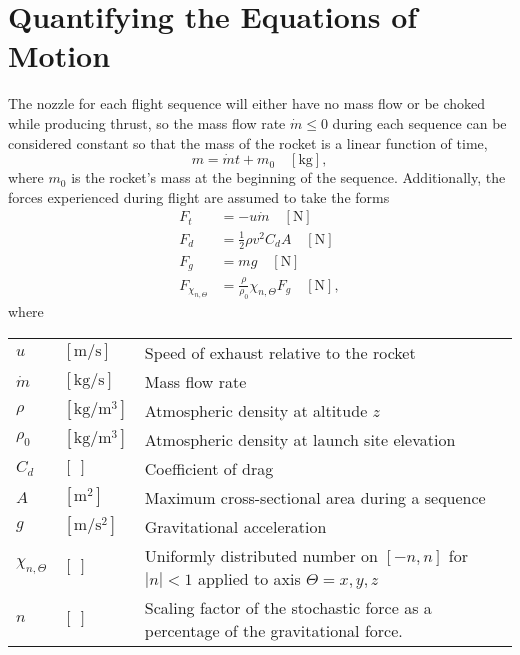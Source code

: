 \documentclass[11pt]{thesis}
\numberwithin{equation}{section}
\begin{document}
\section{Quantifying the Equations of Motion}
The nozzle for each flight sequence will either have no mass flow or be choked while producing thrust, so the mass flow rate $\dot{m} \leq 0$ during each sequence can be considered constant so that the mass of the rocket is a linear function of time,
\begin{equation}
m = \dot{m} t + m_0 \quad [\si{\kg}], \label{eq:m}
\end{equation}
where $m_0$ is the rocket's mass at the beginning of the sequence. Additionally, the forces experienced during flight are assumed to take the forms
\begin{align}
F_t &= -u\dot{m} \quad [\si{\N}] \label{eq:F_t} \,\\
F_d &= \frac{1}{2} \rho v^2 C_d A \quad [\si{\N}] \ \label{eq:F_d} \,\\
F_g &= mg \quad [\si{\N}] \label{eq:F_g} \,\\
F_{\chi_{n,\Theta}} &= \frac{\rho}{\rho_0} \chi_{n,\Theta}  F_g\quad [\si{\N}], \label{eq:F_X}
\end{align}
where
\begin{longtable}[l]{l l l}
$u$ & $[\si{\m/\s}]$ & Speed of exhaust relative to the rocket \\
$\dot{m}$ & $[\si{\kg/\s}]$ & Mass flow rate \\
$\rho$ & $[\si{\kg/\m\cubed}]$ & Atmospheric density at altitude $z$ \\
$\rho_0$ & $[\si{\kg/\m\cubed}]$ & Atmospheric density at launch site elevation \\
$C_d$ & $[\ ]$ & Coefficient of drag \\
$A$ & $[\si{\m\squared}]$ & Maximum cross-sectional area during a sequence \\
$g$ & $[\si{\m/\s\squared}]$ & Gravitational acceleration \\
$\chi_{n,\Theta}$ & $[\ ]$ & Uniformly distributed number on $[-n, n]$ for $|n| < 1$ applied to axis $\Theta = x,y,z$ \\
$n$ & $[\ ]$ & Scaling factor of the stochastic force as a percentage of the gravitational force.
\end{longtable}
\end{document}
